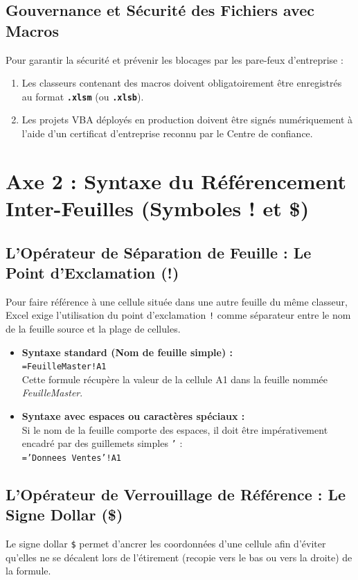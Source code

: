 \documentclass[12pt,a4paper]{article}
\begin{document}
\subsection{Gouvernance et Sécurité des Fichiers avec Macros}
Pour garantir la sécurité et prévenir les blocages par les pare-feux d'entreprise :
\begin{enumerate}
    \item Les classeurs contenant des macros doivent obligatoirement être enregistrés au format \textbf{\texttt{.xlsm}} (ou \textbf{\texttt{.xlsb}}).
    \item Les projets VBA déployés en production doivent être signés numériquement à l'aide d'un certificat d'entreprise reconnu par le Centre de confiance.
\end{enumerate}

\section{Axe 2 : Syntaxe du Référencement Inter-Feuilles (Symboles ! et \$)}

\subsection{L'Opérateur de Séparation de Feuille : Le Point d'Exclamation (!)}
Pour faire référence à une cellule située dans une autre feuille du même classeur, Excel exige l'utilisation du point d'exclamation \texttt{!} comme séparateur entre le nom de la feuille source et la plage de cellules.

\begin{itemize}
    \item \textbf{Syntaxe standard (Nom de feuille simple) :} \\
    \texttt{=FeuilleMaster!A1} \\
    Cette formule récupère la valeur de la cellule A1 dans la feuille nommée \textit{FeuilleMaster}.
    \item \textbf{Syntaxe avec espaces ou caractères spéciaux :} \\
    Si le nom de la feuille comporte des espaces, il doit être impérativement encadré par des guillemets simples \texttt{'} : \\
    \texttt{='Donnees Ventes'!A1}
\end{itemize}

\subsection{L'Opérateur de Verrouillage de Référence : Le Signe Dollar (\$)}
Le signe dollar \texttt{\$} permet d'ancrer les coordonnées d'une cellule afin d'éviter qu'elles ne se décalent lors de l'étirement (recopie vers le bas ou vers la droite) de la formule.
\end{document}

